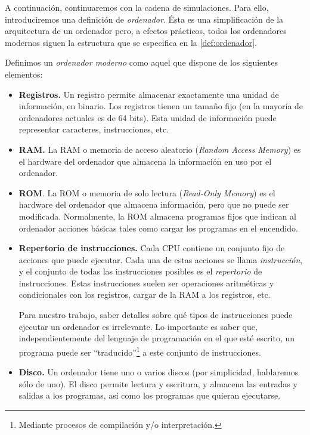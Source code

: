 A continuación, continuaremos con la cadena de simulaciones. Para ello, introduciremos una definición de \emph{ordenador}. Ésta es una simplificación de la arquitectura de un ordenador pero, a efectos prácticos, todos los ordenadores modernos siguen la estructura que se especifica en la \cref{def:ordenador}. \cite{Nisan2005}

\begin{definicion}\label{def:ordenador}
Definimos un \emph{ordenador moderno} como aquel que dispone de los siguientes elementos:
\begin{itemize}
    \item \textbf{Registros.} Un registro permite almacenar exactamente una unidad de información, en binario. Los registros tienen un tamaño fijo (en la mayoría de ordenadores actuales es de 64 bits). Esta unidad de información puede representar caracteres, instrucciones, etc.
    \item \textbf{RAM.} La RAM o memoria de acceso aleatorio (\textit{Random Access Memory}) es el hardware del ordenador que almacena la información en uso por el ordenador.
    \item \textbf{ROM}. La ROM o memoria de solo lectura (\textit{Read-Only Memory}) es el hardware del ordenador que almacena información, pero que no puede ser modificada. Normalmente, la ROM almacena programas fijos que indican al ordenador acciones básicas tales como cargar los programas en el encendido.
    \item \textbf{Repertorio de instrucciones.} Cada CPU contiene un conjunto fijo de acciones que puede ejecutar. Cada una de estas acciones se llama \emph{instrucción}, y el conjunto de todas las instrucciones posibles es el \emph{repertorio} de instrucciones. Estas instrucciones suelen ser operaciones aritméticas y condicionales con los registros, cargar de la RAM a los registros, etc.
    
    Para nuestro trabajo, saber detalles sobre qué tipos de instrucciones puede ejecutar un ordenador es irrelevante. Lo importante es saber que, independientemente del lenguaje de programación en el que esté escrito, un programa puede ser ``traducido''\footnote{Mediante procesos de compilación y/o interpretación.} a este conjunto de instrucciones.
    \item \textbf{Disco.} Un ordenador tiene uno o varios discos (por simplicidad, hablaremos sólo de uno). El disco permite lectura y escritura, y almacena las entradas y salidas a los programas, así como los programas que quieran ejecutarse.
\end{itemize}


\end{definicion}


